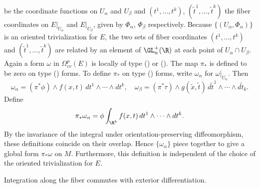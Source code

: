 be the coordinate functions on $U_\alpha$ and $U_\beta$ and $(t^1,\dots,t^k)$, $(\widetilde{t}^1,\dots,\widetilde{t}^k)$ the fiber coordinates on $E|_{U_\alpha}$ and 
$E|_{U_\beta}$, given by $\varPhi_\alpha$, $\varPhi_{\beta}$ respectively. Because $\{(U_\alpha,\varPhi_\alpha)\}$ is an oriented trivialization for $E$, the two sets 
of fiber coordinates $(t^1,\dots,t^k)$ and $(\widetilde{t}^1,\dots,\widetilde{t}^k)$ are related by an element of $\GL_n^+(\R)$ at each point of $U_\alpha\cap U_\beta$. 
Again a form $\omega$ in $\Omega_{cv}^p(E)$ is locally of type () or (). The map $\pi_*$ is defined to be zero on type () forms. To define $\pi_*$ on type () forms, write $\omega_\alpha$ for $\omega|_{U_\alpha}$. Then
\[\omega_\alpha=(\pi^*\phi)\wedge f(x,t)\,dt^1\wedge\cdots\wedge dt^k,\quad \omega_\beta=(\pi^*\tau)\wedge g(\widetilde{x},\widetilde{t})\,d\widetilde{t}^1\wedge\cdots\wedge d\widetilde{t}_k.\]
Define
\[\pi_*\omega_\alpha=\phi\int_{\R^k}f(x,t)\, dt^1\wedge\cdots\wedge dt^k.\]
By the invariance of the integral under orientation-preserving diffeomorphism, these definitions coincide on their overlap. Hence $\{\omega_\alpha\}$ piece together to give a global form $\pi_*\omega$ on $M$. Furthermore, this definition is independent of the choice of the oriented trivialization for $E$.
\begin{proposition}
Integration along the fiber commutes with exterior differentiation.
\end{proposition}
